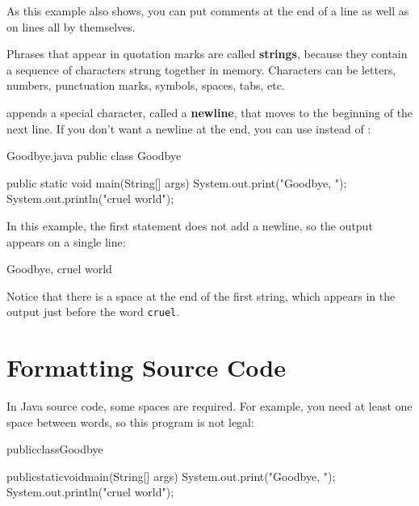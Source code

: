 As this example also shows, you can put comments at the end of a line as well as on lines all by themselves.


Phrases that appear in quotation marks are called {\bf strings}, because they contain a sequence of characters strung together in memory.
Characters can be letters, numbers, punctuation marks, symbols, spaces, tabs, etc.


 appends a special character, called a {\bf newline}, that moves to the beginning of the next line.
If you don't want a newline at the end, you can use  instead of :


\begin{trinket}[235]{Goodbye.java}
public class Goodbye {

    public static void main(String[] args) {
        System.out.print("Goodbye, ");
        System.out.println("cruel world");
    }
}
\end{trinket}

\label{goodbye}

In this example, the first statement does not add a newline, so the output appears on a single line:

\begin{stdout}
Goodbye, cruel world
\end{stdout}

Notice that there is a space at the end of the first string, which appears in the output just before the word {\tt cruel}.


\section{Formatting Source Code}
\label{formatting}

In Java source code, some spaces are required.
For example, you need at least one space between words, so this program is not legal:

\begin{code}
publicclassGoodbye{

    publicstaticvoidmain(String[] args) {
        System.out.print("Goodbye, ");
        System.out.println("cruel world");
    }
}
\end{code}


